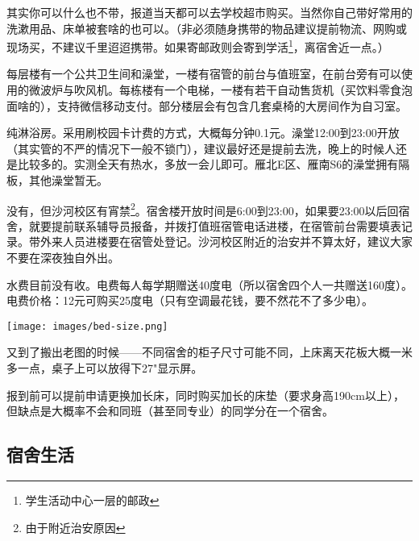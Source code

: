 
其实你可以什么也不带，报道当天都可以去学校超市购买。当然你自己带好常用的洗漱用品、床单被套啥的也可以。（非必须随身携带的物品建议提前物流、网购或现场买，不建议千里迢迢携带。如果寄邮政则会寄到学活\footnote{学生活动中心一层的邮政}，离宿舍近一点。）


每层楼有一个公共卫生间和澡堂，一楼有宿管的前台与值班室，在前台旁有可以使用的微波炉与吹风机。每栋楼有一个电梯，一楼有若干自动售货机（买饮料零食泡面啥的），支持微信移动支付。部分楼层会有包含几套桌椅的大房间作为自习室。


纯淋浴房。采用刷校园卡计费的方式，大概每分钟0.1元。澡堂12:00到23:00开放（其实管的不严的情况下一般不锁门），建议最好还是提前去洗，晚上的时候人还是比较多的。实测全天有热水，多放一会儿即可。雁北E区、雁南S6的澡堂拥有隔板，其他澡堂暂无。


没有，但沙河校区有宵禁\footnote{由于附近治安原因}。宿舍楼开放时间是6:00到23:00，如果要23:00以后回宿舍，就要提前联系辅导员报备，并拨打值班宿管电话进楼，在宿管前台需要填表记录。带外来人员进楼要在宿管处登记。沙河校区附近的治安并不算太好，建议大家不要在深夜独自外出。


水费目前没有收。电费每人每学期赠送40度电（所以宿舍四个人一共赠送160度）。电费价格：12元可购买25度电（只有空调最花钱，要不然花不了多少电）。


\begin{center}
    \texttt{[image: images/bed-size.png]}
\end{center}

又到了搬出老图的时候——不同宿舍的柜子尺寸可能不同，上床离天花板大概一米多一点，桌子上可以放得下27"显示屏。


报到前可以提前申请更换加长床，同时购买加长的床垫（要求身高190cm以上），但缺点是大概率不会和同班（甚至同专业）的同学分在一个宿舍。

\subsection{宿舍生活}


